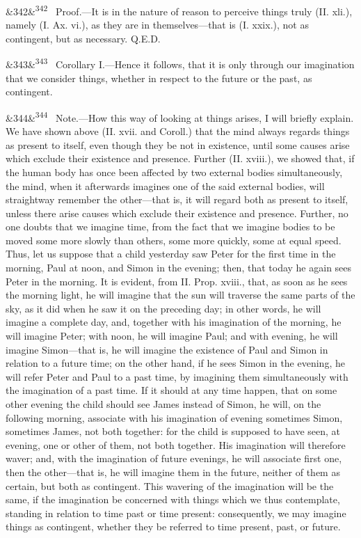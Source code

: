 \documentclass[12pt]{article}
\newcommand{\para}[1][]{\par\noindent\ifx&#1&\else\textsuperscript{\footnotesize #1}~\fi}
\begin{document}
\para[342] Proof.---It is in the nature of reason to perceive things truly (II. xli.), namely (I. Ax. vi.), as they are in themselves---that is (I. xxix.), not as contingent, but as necessary. Q.E.D.

\para[343] Corollary I.---Hence it follows, that it is only through our imagination that we consider things, whether in respect to the future or the past, as contingent.

\para[344] Note.---How this way of looking at things arises, I will briefly explain. We have shown above (II. xvii. and Coroll.) that the mind always regards things as present to itself, even though they be not in existence, until some causes arise which exclude their existence and presence. Further (II. xviii.), we showed that, if the human body has once been affected by two external bodies simultaneously, the mind, when it afterwards imagines one of the said external bodies, will straightway remember the other---that is, it will regard both as present to itself, unless there arise causes which exclude their existence and presence. Further, no one doubts that we imagine time, from the fact that we imagine bodies to be moved some more slowly than others, some more quickly, some at equal speed. Thus, let us suppose that a child yesterday saw Peter for the first time in the morning, Paul at noon, and Simon in the evening; then, that today he again sees Peter in the morning. It is evident, from II. Prop. xviii., that, as soon as he sees the morning light, he will imagine that the sun will traverse the same parts of the sky, as it did when he saw it on the preceding day; in other words, he will imagine a complete day, and, together with his imagination of the morning, he will imagine Peter; with noon, he will imagine Paul; and with evening, he will imagine Simon---that is, he will imagine the existence of Paul and Simon in relation to a future time; on the other hand, if he sees Simon in the evening, he will refer Peter and Paul to a past time, by imagining them simultaneously with the imagination of a past time. If it should at any time happen, that on some other evening the child should see James instead of Simon, he will, on the following morning, associate with his imagination of evening sometimes Simon, sometimes James, not both together: for the child is supposed to have seen, at evening, one or other of them, not both together. His imagination will therefore waver; and, with the imagination of future evenings, he will associate first one, then the other---that is, he will imagine them in the future, neither of them as certain, but both as contingent. This wavering of the imagination will be the same, if the imagination be concerned with things which we thus contemplate, standing in relation to time past or time present: consequently, we may imagine things as contingent, whether they be referred to time present, past, or future.
\end{document}
